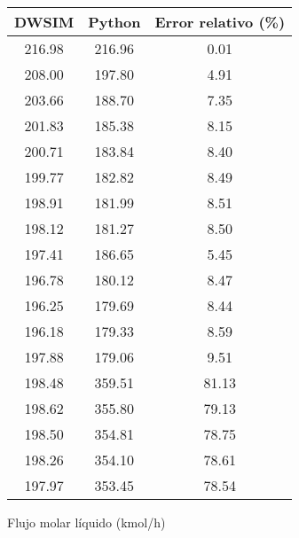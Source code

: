 \begin{figure}[H]
    \centering
    \caption{Flujo molar líquido (kmol/h)}
    \small
    \begin{tabular}{|c|c|c|}
        \hline
        \textbf{DWSIM} & \textbf{Python} & \textbf{Error relativo} (\%) \\
        \hline
        216.98         & 216.96          & 0.01                         \\
        \hline
        208.00         & 197.80          & 4.91                         \\
        \hline
        203.66         & 188.70          & 7.35                         \\
        \hline
        201.83         & 185.38          & 8.15                         \\
        \hline
        200.71         & 183.84          & 8.40                         \\
        \hline
        199.77         & 182.82          & 8.49                         \\
        \hline
        198.91         & 181.99          & 8.51                         \\
        \hline
        198.12         & 181.27          & 8.50                         \\
        \hline
        197.41         & 186.65          & 5.45                         \\
        \hline
        196.78         & 180.12          & 8.47                         \\
        \hline
        196.25         & 179.69          & 8.44                         \\
        \hline
        196.18         & 179.33          & 8.59                         \\
        \hline
        197.88         & 179.06          & 9.51                         \\
        \hline
        198.48         & 359.51          & 81.13                        \\
        \hline
        198.62         & 355.80          & 79.13                        \\
        \hline
        198.50         & 354.81          & 78.75                        \\
        \hline
        198.26         & 354.10          & 78.61                        \\
        \hline
        197.97         & 353.45          & 78.54                        \\

\end{tabular}
\end{figure}
